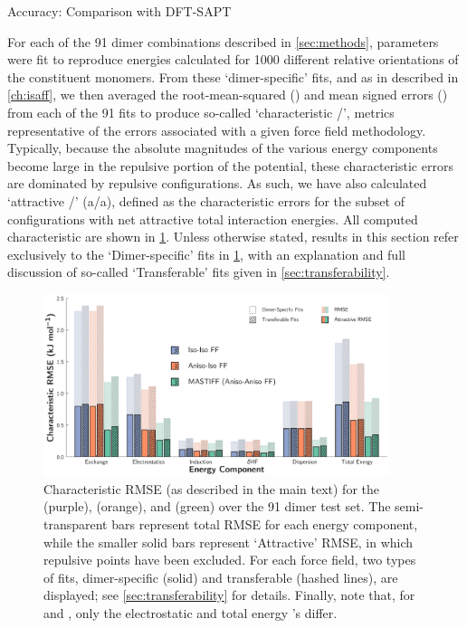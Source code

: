 \begin{subsection}{Accuracy: Comparison with DFT-SAPT}

For each of the 91 dimer combinations described in \cref{sec:methods},
parameters were fit to reproduce \sapt energies calculated for 1000 different
relative orientations of the constituent monomers. 
From these `dimer-specific' fits, and as in
described in \cref{ch:isaff},\cite{VanVleet2016} we then averaged the
root-mean-squared (\rmse) and mean signed errors (\mse) from each of the 91
fits to produce so-called `characteristic \rmse/\mse', metrics
representative of the errors associated with a given force field methodology.
Typically, because the absolute magnitudes of the various energy components
become large in the repulsive portion of the potential, these characteristic
errors are dominated by repulsive
configurations. As such,
we have also calculated `attractive
\rmse/\mse' (a\rmse/a\mse), defined as the characteristic errors for the subset
of configurations with net attractive total interaction energies. 
All computed characteristic \rmse are shown in \cref{fig:rmse}.
Unless otherwise stated, results in this section refer
exclusively to the `Dimer-specific' fits in \cref{fig:rmse}, with an
explanation and full discussion of so-called `Transferable' fits given in
\cref{sec:transferability}.

    \begin{figure}
    \centering
    \includegraphics[width=0.9\textwidth]{anisotropic/rmse_comparisons/transferability_rmse_errors.pdf}
    \caption{
    Characteristic RMSE (as described in the main text) for the \isoff
(purple), \isaff (orange), and \mastiff (green) over the 91
    dimer test set. The semi-transparent bars represent total RMSE
    for each energy component, while the smaller solid bars represent `Attractive'
    RMSE, in which repulsive points have been excluded. For each force field,
    two types of fits, dimer-specific (solid) and transferable (hashed lines),
    are displayed; see \cref{sec:transferability} for details. Finally, note that, for \isoff and \isaff, only the electrostatic
    and total energy \rmse's differ. 
            }
    \label{fig:rmse}
    \end{figure}


\end{subsection}
